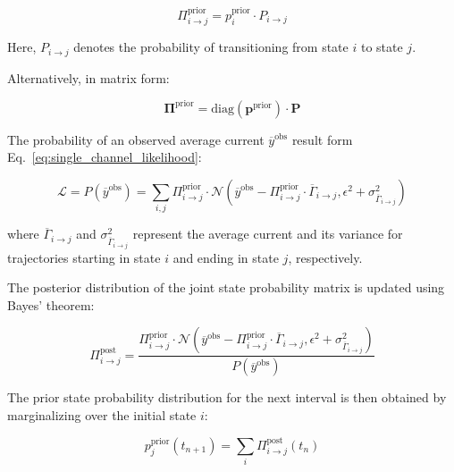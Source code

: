 \documentclass[pdflatex,sn-mathphys-num]{sn-jnl}%
\theoremstyle{thmstyleone}%
\theoremstyle{thmstyletwo}%
\theoremstyle{thmstylethree}%
\begin{document}
\begin{equation}
	\Pi_{i \rightarrow j}^{\text{prior}} = p^{\text{prior}}_i \cdot P_{i \rightarrow j}
	\label{eq:joint_state_probability}
\end{equation}

Here, \( P_{i \rightarrow j} \) denotes the probability of transitioning from state \( i \) to state \( j \).

Alternatively, in matrix form:

\begin{equation}
	\boldsymbol{\Pi}^{\text{prior}} = \mathrm{diag}(\boldsymbol{p}^{\text{prior}}) \cdot \mathbf{P}
	\label{eq:joint_state_probability_matrix}
\end{equation}

The probability of an observed average current \( \overline{y}^{\text{obs}} \) result form Eq.~\ref{eq:single_channel_likelihood}:

\begin{equation}
	\mathcal{L}=P(\overline{y}^{\text{obs}}) = \sum_{i, j} \Pi_{i \rightarrow j}^{\text{prior}} \cdot \mathcal{N}\left(\overline{y}^{\text{obs}} - \Pi_{i \rightarrow j}^{\text{prior}} \cdot \overline{\Gamma}_{i \rightarrow j}, \epsilon^2 + \sigma^2_{\overline{\Gamma}_{i \rightarrow j}}\right)
	\label{eq:single_channel_integrated_likelihood}
\end{equation}

where \( \overline{\Gamma}_{i \rightarrow j} \) and \( \sigma^2_{\overline{\Gamma}_{i \rightarrow j}} \) represent the average current and its variance for trajectories starting in state \( i \) and ending in state \( j \), respectively.

The posterior distribution of the joint state probability matrix is updated using Bayes' theorem:

\begin{equation}
	\Pi_{i \rightarrow j}^{\text{post}} = \frac{\Pi_{i \rightarrow j}^{\text{prior}} \cdot \mathcal{N}\left(\overline{y}^{\text{obs}} - \Pi_{i \rightarrow j}^{\text{prior}} \cdot \overline{\Gamma}_{i \rightarrow j}, \epsilon^2 + \sigma^2_{\overline{\Gamma}_{i \rightarrow j}}\right)}{P(\overline{y}^{\text{obs}})}
	\label{eq:single_channel_integrated_posterior}
\end{equation}

The prior state probability distribution for the next interval is then obtained by marginalizing over the initial state \( i \):

\begin{equation}
	p_j^{\text{prior}}(t_{n+1}) = \sum_i \Pi_{i \rightarrow j}^{\text{post}}(t_n)
	\label{eq:single_channel_integrated_next_prior}
\end{equation}
\end{document}
